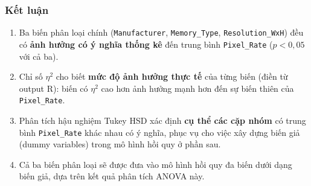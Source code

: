 \subsubsection{Kết luận}

\begin{enumerate}
  \item Ba biến phân loại chính (\texttt{Manufacturer}, \texttt{Memory\_Type},
        \texttt{Resolution\_WxH}) đều có \textbf{ảnh hưởng có ý nghĩa thống kê}
        đến trung bình \texttt{Pixel\_Rate} ($p < 0{,}05$ với cả ba).

  \item Chỉ số $\eta^2$ cho biết \textbf{mức độ ảnh hưởng thực tế} của từng biến
        (điền từ output R): biến có $\eta^2$ cao hơn ảnh hưởng mạnh hơn đến sự
        biến thiên của \texttt{Pixel\_Rate}.

  \item Phân tích hậu nghiệm Tukey HSD xác định \textbf{cụ thể các cặp nhóm}
        có trung bình \texttt{Pixel\_Rate} khác nhau có ý nghĩa, phục vụ cho việc
        xây dựng biến giả (dummy variables) trong mô hình hồi quy ở phần sau.

  \item Cả ba biến phân loại sẽ được đưa vào mô hình hồi quy đa biến dưới dạng
        biến giả, dựa trên kết quả phân tích ANOVA này.
\end{enumerate}
